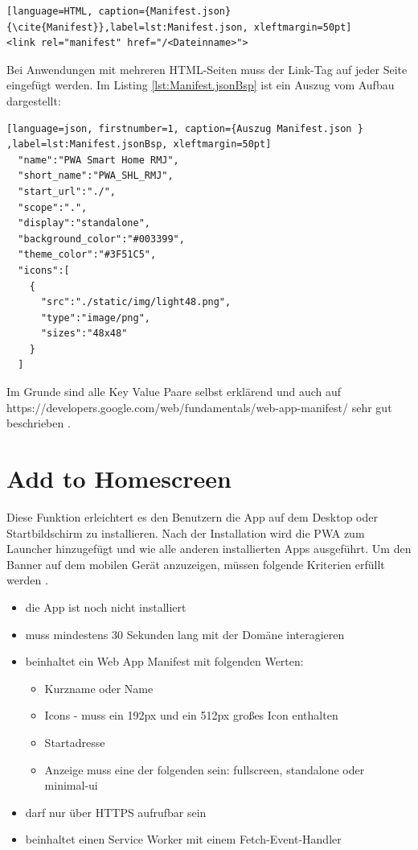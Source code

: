 \begin{lstlisting}[language=HTML, caption={Manifest.json} {\cite{Manifest}},label=lst:Manifest.json, xleftmargin=50pt]
<link rel="manifest" href="/<Dateinname>">
\end{lstlisting}

Bei Anwendungen mit mehreren \acs{HTML}-Seiten muss der Link-Tag auf jeder Seite eingefügt werden. 
Im Listing \ref{lst:Manifest.jsonBsp} ist ein Auszug vom Aufbau dargestellt:
	\begin{lstlisting}[language=json, firstnumber=1, caption={Auszug Manifest.json } ,label=lst:Manifest.jsonBsp, xleftmargin=50pt]
  "name":"PWA Smart Home RMJ",
  "short_name":"PWA_SHL_RMJ",
  "start_url":"./",
  "scope":".",
  "display":"standalone",
  "background_color":"#003399",
  "theme_color":"#3F51C5",
  "icons":[
    {
      "src":"./static/img/light48.png",
      "type":"image/png",
      "sizes":"48x48"
    }
  ]

\end{lstlisting}

Im Grunde sind alle Key Value Paare selbst erklärend und auch auf https://developers.google.com/web/fundamentals/web-app-manifest/ sehr gut beschrieben \cite{Manifest}. 

\section{Add to Homescreen}\label{sub:AddtoHomescreen}
Diese Funktion erleichtert es den Benutzern die App auf dem Desktop oder Startbildschirm zu installieren. Nach der Installation wird die PWA zum Launcher hinzugefügt und wie alle anderen installierten Apps ausgeführt.
Um den Banner auf dem mobilen Gerät anzuzeigen, müssen folgende Kriterien erfüllt werden \cite{AddToHomescreen}.


\begin{itemize}
    \item  die App ist noch nicht installiert
	\item  muss mindestens 30 Sekunden lang mit der Domäne interagieren
	\item  beinhaltet ein Web App Manifest mit folgenden Werten:
		 \begin{itemize}
         \item Kurzname oder Name
         \item Icons - muss ein 192px und ein 512px großes Icon enthalten
         \item Startadresse
         \item Anzeige muss eine der folgenden sein: fullscreen, standalone oder \\ minimal-ui
      	\end{itemize}
    \item 	darf nur über HTTPS aufrufbar sein
    \item beinhaltet einen Service Worker mit einem Fetch-Event-Handler  
\end{itemize}


